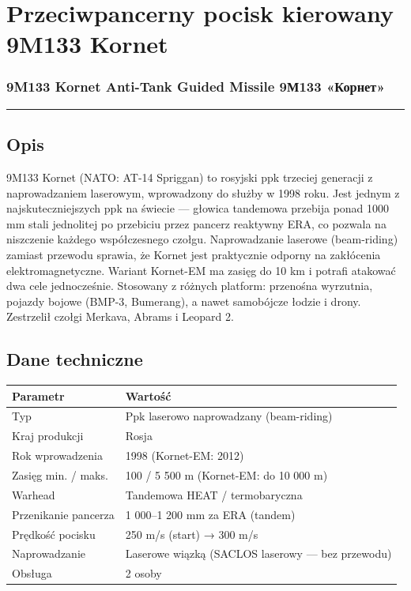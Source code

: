 \documentclass[12pt,openany,oneside]{book}
\begin{document}
\chapter{Przeciwpancerny pocisk kierowany 9M133
Kornet}\label{przeciwpancerny-pocisk-kierowany-9m133-kornet}

\subsection{9M133 Kornet Anti-Tank Guided Missile \textbar{} 9М133
«Корнет»}\label{m133-kornet-anti-tank-guided-missile-9ux43c133-ux43aux43eux440ux43dux435ux442}

\begin{center}\rule{0.5\linewidth}{0.5pt}\end{center}

\section{Opis}\label{opis-38}

9M133 Kornet (NATO: AT-14 Spriggan) to rosyjski ppk trzeciej generacji z
naprowadzaniem laserowym, wprowadzony do służby w 1998 roku. Jest jednym
z najskuteczniejszych ppk na świecie --- głowica tandemowa przebija
ponad 1000 mm stali jednolitej po przebiciu przez pancerz reaktywny ERA,
co pozwala na niszczenie każdego współczesnego czołgu. Naprowadzanie
laserowe (beam-riding) zamiast przewodu sprawia, że Kornet jest
praktycznie odporny na zakłócenia elektromagnetyczne. Wariant Kornet-EM
ma zasięg do 10 km i potrafi atakować dwa cele jednocześnie. Stosowany z
różnych platform: przenośna wyrzutnia, pojazdy bojowe (BMP-3, Bumerang),
a nawet samobójcze łodzie i drony. Zestrzelił czołgi Merkava, Abrams i
Leopard 2.

\section{Dane techniczne}\label{dane-techniczne-38}

\begin{longtable}[]{@{}ll@{}}
\toprule\noalign{}
Parametr & Wartość \\
\midrule\noalign{}
\endhead
\bottomrule\noalign{}
\endlastfoot
Typ & Ppk laserowo naprowadzany (beam-riding) \\
Kraj produkcji & Rosja \\
Rok wprowadzenia & 1998 (Kornet-EM: 2012) \\
Zasięg min. / maks. & 100 / 5 500 m (Kornet-EM: do 10 000 m) \\
Warhead & Tandemowa HEAT / termobaryczna \\
Przenikanie pancerza & 1 000--1 200 mm za ERA (tandem) \\
Prędkość pocisku & 250 m/s (start) → 300 m/s \\
Naprowadzanie & Laserowe wiązką (SACLOS laserowy --- bez przewodu) \\
Obsługa & 2 osoby \\
\end{longtable}
\end{document}
